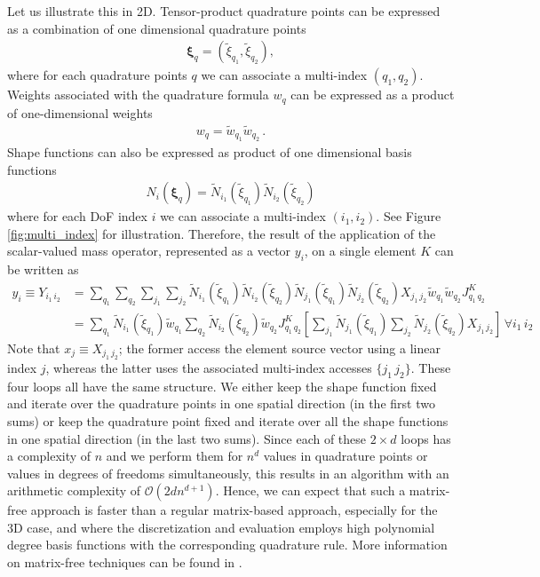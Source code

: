 \documentclass[times,doublespace]{nmeauth}
\def\gz  #1{           \mbox{$\boldsymbol{#1}$}}
\begin{document}
Let us illustrate this in 2D. Tensor-product quadrature points can be expressed as a combination of one dimensional quadrature points
\begin{align}
  \gz \xi_q = (\widetilde{\xi}_{q_1}, \widetilde{\xi}_{q_2}),
\end{align}
where for each quadrature points $q$ we can associate a multi-index $(q_1,q_2)$.
Weights associated with the quadrature formula $w_q$ can be expressed as a product of one-dimensional weights
\begin{align}
  w_q = \widetilde{w}_{q_1} \widetilde{w}_{q_2} \, .
\end{align}
Shape functions can also be expressed as product of one dimensional basis functions
\begin{align}
  N_i(\gz \xi_q) =
  \widetilde{N}_{i_1}(\widetilde{\xi}_{q_1})
  \widetilde{N}_{i_2}(\widetilde{\xi}_{q_2})
\end{align}
where for each DoF index $i$ we can associate a multi-index $(i_1, i_2)$.
{\color{red}
See Figure \ref{fig:multi_index} for illustration.
}
%
Therefore, the result of the application of the scalar-valued mass operator, represented as a vector $y_i$, on a single element $K$ can be written as
\begin{align*}
  y_{i} \equiv Y_{i_1\,i_2} & = \sum_{q_1} \sum_{q_2} \sum_{j_1} \sum_{j_2}
  \widetilde{N}_{i_1}(\widetilde{\xi}_{q_1})
  \widetilde{N}_{i_2}(\widetilde{\xi}_{q_2})
  \widetilde{N}_{j_1}(\widetilde{\xi}_{q_1})
  \widetilde{N}_{j_2}(\widetilde{\xi}_{q_2})
  X_{j_1\,j_2}
  \widetilde{w}_{q_1} \widetilde{w}_{q_2} J^K_{q_1\,q_2}
  \\
  &=
  \sum_{q_1} \widetilde{N}_{i_1}(\widetilde{\xi}_{q_1}) \widetilde{w}_{q_1}
  \sum_{q_2} \widetilde{N}_{i_2}(\widetilde{\xi}_{q_2}) \widetilde{w}_{q_2}
  J^K_{q_1\,q_2}
  \left[
    \sum_{j_1}
    \widetilde{N}_{j_1}(\widetilde{\xi}_{q_1})
    \sum_{j_2}
    \widetilde{N}_{j_2}(\widetilde{\xi}_{q_2})
    X_{j_1\,j_2}
  \right]\, \forall i_1 \, i_2
\end{align*}
%
{\color{red}
Note that $x_j \equiv X_{j_1\,j_2}$; the former access the element source vector using a linear index $j$, whereas the latter uses the associated multi-index accesses $\{j_1\,j_2\}$.
}
%
These four loops all have the same structure.
We either keep the shape function fixed and iterate over the quadrature points in one spatial direction (in the first two sums) or keep the quadrature point fixed and iterate over all the shape functions in one spatial direction (in the last two sums).
Since each of these $2\times d$ loops has a complexity of $n$ and we perform them for $n^d$ values in quadrature points or values in degrees of freedoms simultaneously, this results in an algorithm with an arithmetic complexity of $\mathcal{O}(2dn^{d+1})$.
Hence, we can expect that such a matrix-free approach is faster than a regular matrix-based approach, especially for the 3D case, and where the discretization and evaluation employs high polynomial degree basis functions with the corresponding quadrature rule.
More information on matrix-free techniques can be found in \cite{kronbichler12,vos10}.
\end{document}

